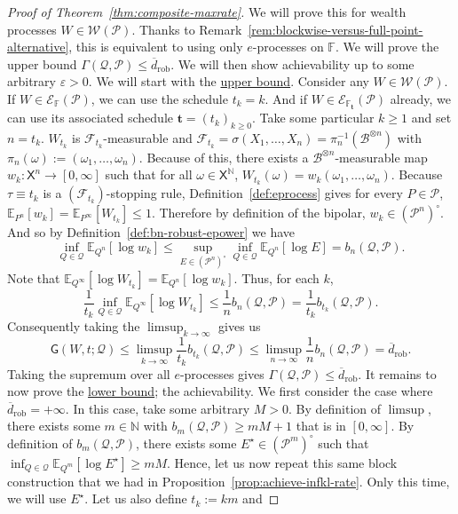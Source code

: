 \documentclass[11pt]{article}
\newcommand{\E}{\mathbb{E}}
\newcommand{\Pcal}{\mathcal{P}}
\newcommand{\Qcal}{\mathcal{Q}}
\newcommand{\X}{\mathsf{X}}
\newcommand{\B}{\mathcal{B}}
\newcommand{\bbF}{\mathbb F}
\newcommand{\bt}{\mathbf t}
\newcommand{\Wcal}{\mathcal W}
\theoremstyle{definition}
\theoremstyle{definition}
\begin{document}
\begin{proof}[Proof of Theorem~\ref{thm:composite-maxrate}]
We will prove this for wealth processes $W\in\Wcal(\Pcal)$. Thanks to Remark~\ref{rem:blockwise-versus-full-point-alternative}, this is equivalent to using only $e$-processes on $\bbF$. We will prove the upper bound $\Gamma(\Qcal,\Pcal)\le \overline d_{\mathrm{rob}}$. We will then show achievability up to some arbitrary $\varepsilon>0$. We will start with the \underline{upper bound}. Consider any $W\in\Wcal(\Pcal)$. If $W\in\mathcal E_{\bbF}(\Pcal)$, we can use the schedule $t_k=k$. And if $W\in\mathcal E_{\bbF_{\bt}}(\Pcal)$ already, we can use its associated schedule $\bt=(t_k)_{k\ge 0}$. Take some particular $k\ge 1$ and set $n=t_k$. $W_{t_k}$ is $\mathcal F_{t_k}$-measurable and $\mathcal F_{t_k}=\sigma(X_1,\dots,X_n)=\pi_n^{-1}(\B^{\otimes n})$ with $\pi_n(\omega):=(\omega_1,\dots,\omega_n)$. Because of this, there exists a $\B^{\otimes n}$-measurable map $w_k:\X^n\to[0,\infty]$ such that for all $\omega\in\X^{\mathbb N}$, $W_{t_k}(\omega)=w_k(\omega_1,\dots,\omega_n)$. Because $\tau\equiv t_k$ is a $(\mathcal F_{t_k})$-stopping rule, Definition~\ref{def:eprocess} gives for every $P\in\Pcal$, $\E_{P^n}[w_k]=\E_{P^\infty}[W_{t_k}]\le 1$. Therefore by definition of the bipolar, $w_k\in(\Pcal^n)^\circ$. And so by Definition~\ref{def:bn-robust-epower} we have
\[
\inf_{Q\in\Qcal}\E_{Q^n}[\log w_k]\le \sup_{E\in(\Pcal^n)^\circ}\inf_{Q\in\Qcal}\E_{Q^n}[\log E]= b_n(\Qcal,\Pcal).
\]
Note that $\E_{Q^\infty}[\log W_{t_k}]=\E_{Q^n}[\log w_k]$. Thus, for each $k$,
\[
\frac{1}{t_k}\inf_{Q\in\Qcal}\E_{Q^\infty}[\log W_{t_k}] \le \frac{1}{n}b_n(\Qcal,\Pcal)=\frac{1}{t_k}b_{t_k}(\Qcal,\Pcal).
\]
Consequently taking the $\limsup_{k\to\infty}$ gives us
\[
\mathsf{G}(W,t;\Qcal)\le \limsup_{k\to\infty}\frac{1}{t_k}b_{t_k}(\Qcal,\Pcal)\le \limsup_{n\to\infty}\frac{1}{n}b_n(\Qcal,\Pcal) = \overline d_{\mathrm{rob}}.
\]
Taking the supremum over all $e$-processes gives $\Gamma(\Qcal,\Pcal)\le \overline d_{\mathrm{rob}}$. It remains to now prove the \underline{lower bound}; the achievability. We first consider the case where $\overline d_{\mathrm{rob}}=+\infty$. In this case, take some arbitrary $M>0$. By definition of $\limsup$, there exists some $m\in\mathbb N$ with $b_m(\Qcal,\Pcal)\ge mM+1$ that is in $[0,\infty]$. By definition of $b_m(\Qcal,\Pcal)$, there exists some $E^\star\in(\Pcal^m)^\circ$ such that $\inf_{Q\in\Qcal}\E_{Q^m}[\log E^\star]\ge mM$. Hence, let us now repeat this same block construction that we had in Proposition~\ref{prop:achieve-infkl-rate}. Only this time, we will use $E^\star$. Let us also define $t_k:=km$ and

\end{proof}
\end{document}
